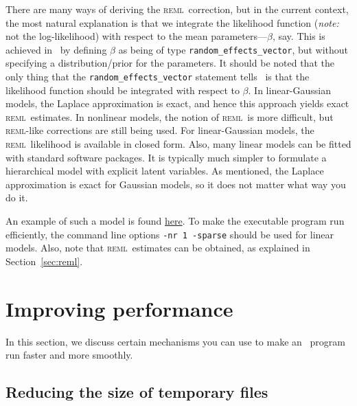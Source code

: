 \documentclass{admbmanual}
\newcommand{\scREML}{\textsc{reml}}
\begin{document}
There are many ways of deriving the \scREML\ correction, but in the current
context, the most natural explanation is that we integrate the likelihood
function (\textit{note:} not the log-likelihood) with respect to the mean
parameters---$\beta$, say. This is achieved in \scAR\ by defining $\beta$ as
being of type \texttt{random\_effects\_vector}, but without specifying a
distribution/prior for the parameters. It should be noted that the only thing
that the \texttt{random\_effects\_vector} statement tells \scAR\ is that the
likelihood function should be integrated with respect to $\beta$. In
linear-Gaussian models, the Laplace approximation is exact, and hence this
approach yields exact \scREML\ estimates. In nonlinear models, the notion of
\scREML\ is more difficult, but \scREML-like corrections are still being used.
For linear-Gaussian models, the \scREML\ likelihood is available in closed form.
Also, many linear models can be fitted with standard software packages. It is
typically much simpler to formulate a hierarchical model with explicit latent
variables. As mentioned, the Laplace approximation is exact for Gaussian models,
so it does not matter what way you do it.

An example of such a model is found
\href{http://otter-rsch.com/admbre/examples/bcb/bcb.html}{here}. To make the
executable program run efficiently, the command line options
\texttt{-nr 1 -sparse} should be used for linear models. Also, note that
\scREML\ estimates can be obtained, as explained in Section~\ref{sec:reml}.

\section{Improving performance}
\label{sec:improving}

In this section, we discuss certain mechanisms you can use to make an \scAR\
program run faster and more smoothly.

\subsection{Reducing the size of temporary files}
\label{Memory_management}
\end{document}
